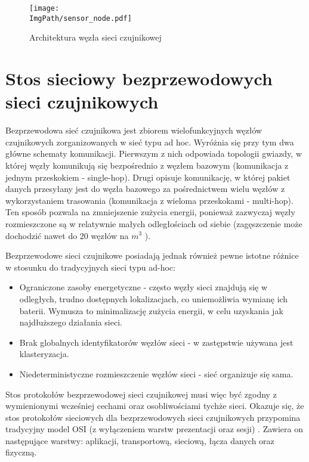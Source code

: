 \begin{figure}[H]
	\begin{center}
		\texttt{[image: \\ImgPath/sensor\_node.pdf]}
	\end{center}
	\caption{Architektura węzła sieci czujnikowej}
\end{figure}

\section{Stos sieciowy bezprzewodowych sieci czujnikowych}

Bezprzewodowa sieć czujnikowa jest zbiorem wielofunkcyjnych węzłów czujnikowych zorganizowanych w sieć typu ad hoc. Wyróżnia się przy tym dwa główne schematy komunikacji. Pierwszym z nich odpowiada topologii gwiazdy, w której węzły komunikują się bezpośrednio z węzłem bazowym (komunikacja z jednym przeskokiem - single-hop). Drugi opisuje komunikację, w której pakiet danych przesyłany jest do węzła bazowego za pośrednictwem wielu węzłów z wykorzystaniem trasowania (komunikacja z wieloma przeskokami - multi-hop). Ten sposób pozwala na zmniejszenie zużycia energii, ponieważ zazwyczaj węzły rozmieszczone są w relatywnie małych odległościach od siebie (zagęszczenie może dochodzić nawet do 20 węzłów na $m^{3}$ \cite{Shih2001}).

Bezprzewodowe sieci czujnikowe posiadają jednak również pewne istotne różnice w stosunku do tradycyjnych sieci typu ad-hoc:
\begin{itemize}
\item Ograniczone zasoby energetyczne - często węzły sieci znajdują się w odległych, trudno dostępnych lokalizacjach, co uniemożliwia wymianę ich baterii. Wymusza to minimalizację zużycia energii, w celu uzyskania jak najdłuższego działania sieci.
\item Brak globalnych identyfikatorów węzłów sieci - w zastępstwie używana jest klasteryzacja.
\item Niedeterministyczne rozmieszczenie węzłów sieci - sieć organizuje się sama.
\end{itemize}

Stos protokołów bezprzewodowej sieci czujnikowej musi więc być zgodny z wymienionymi wcześniej cechami oraz osobliwościami tychże sieci. Okazuje się, że  stos protokołów sieciowych dla bezprzewodowych sieci czujnikowych przypomina tradycyjny model OSI (z wyłączeniem warstw prezentacji oraz sesji) \cite{Akyildiz2002.09}. Zawiera on następujące warstwy: aplikacji, transportową, sieciową, łącza danych oraz fizyczną.

